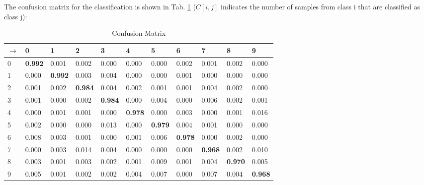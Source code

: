\documentclass[11pt]{article}
\begin{document}
The confusion matrix for the classification is shown in Tab. \ref{my-label} ($C[i,j]$ indicates the number of samples from class i that are classified as class j):

\begin{table}[ht]
\centering
\caption{Confusion Matrix}
\label{my-label}
\begin{tabular}{@{}lllllllllll@{}}
\toprule
  $\rightarrow$ & 0              & 1              & 2              & 3              & 4              & 5              & 6              & 7              & 8              & 9              \\ \midrule
0 & \textbf{0.992} & 0.001          & 0.002          & 0.000          & 0.000          & 0.000          & 0.002          & 0.001          & 0.002          & 0.000          \\
1 & 0.000          & \textbf{0.992} & 0.003          & 0.004          & 0.000          & 0.000          & 0.001          & 0.000          & 0.000          & 0.000          \\
2 & 0.001          & 0.002          & \textbf{0.984} & 0.004          & 0.002          & 0.001          & 0.001          & 0.004          & 0.002          & 0.000          \\
3 & 0.001          & 0.000          & 0.002          & \textbf{0.984} & 0.000          & 0.004          & 0.000          & 0.006          & 0.002          & 0.001          \\
4 & 0.000          & 0.001          & 0.001          & 0.000          & \textbf{0.978} & 0.000          & 0.003          & 0.000          & 0.001          & 0.016          \\
5 & 0.002          & 0.000          & 0.000          & 0.013          & 0.000          & \textbf{0.979} & 0.004          & 0.001          & 0.000          & 0.000          \\
6 & 0.008          & 0.003          & 0.001          & 0.000          & 0.001          & 0.006          & \textbf{0.978} & 0.000          & 0.002          & 0.000          \\
7 & 0.000          & 0.003          & 0.014          & 0.004          & 0.000          & 0.000          & 0.000          & \textbf{0.968} & 0.002          & 0.010          \\
8 & 0.003          & 0.001          & 0.003          & 0.002          & 0.001          & 0.009          & 0.001          & 0.004          & \textbf{0.970} & 0.005          \\
9 & 0.005          & 0.001          & 0.002          & 0.002          & 0.004          & 0.007          & 0.000          & 0.007          & 0.004          & \textbf{0.968} \\ \bottomrule
\end{tabular}
\end{table}
\end{document}

